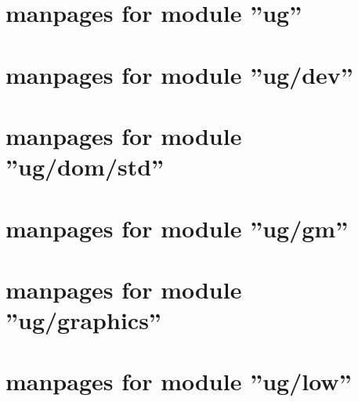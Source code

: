 \newpage
{
\small
\tableofcontents
}
\clearpage

\thispagestyle{plain}
\section{manpages for module ''ug''}
\renewcommand{\sectitle}{ug}


\thispagestyle{plain}
\section{manpages for module ''ug/dev''}
\renewcommand{\sectitle}{ug/dev}


%

%

%

\thispagestyle{plain}
\section{manpages for module ''ug/dom/std''}
\renewcommand{\sectitle}{ug/dom/std}


\thispagestyle{plain}
\section{manpages for module ''ug/gm''}
\renewcommand{\sectitle}{ug/gm}


\thispagestyle{plain}
\section{manpages for module ''ug/graphics''}
\renewcommand{\sectitle}{ug/graphics/uggraph}


\thispagestyle{plain}
\section{manpages for module ''ug/low''}
\renewcommand{\sectitle}{ug/low}




